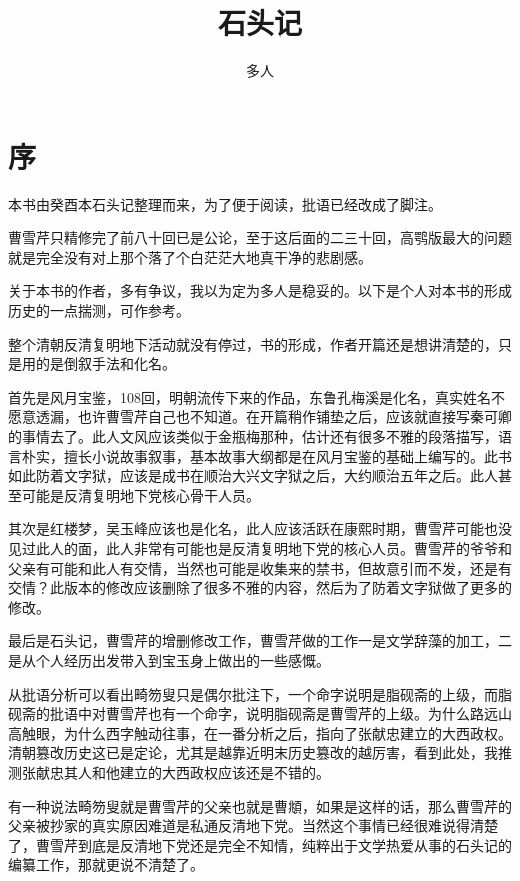 \documentclass[12pt,oneside]{book}
\title{石头记}
\author{多人}
\begin{document}



\frontmatter 
{}
\chapter*{序}
本书由癸酉本石头记整理而来，为了便于阅读，批语已经改成了脚注。

曹雪芹只精修完了前八十回已是公论，至于这后面的二三十回，高鹗版最大的问题就是完全没有对上那个落了个白茫茫大地真干净的悲剧感。

关于本书的作者，多有争议，我以为定为多人是稳妥的。以下是个人对本书的形成历史的一点揣测，可作参考。

整个清朝反清复明地下活动就没有停过，书的形成，作者开篇还是想讲清楚的，只是用的是倒叙手法和化名。

首先是风月宝鉴，108回，明朝流传下来的作品，东鲁孔梅溪是化名，真实姓名不愿意透漏，也许曹雪芹自己也不知道。在开篇稍作铺垫之后，应该就直接写秦可卿的事情去了。此人文风应该类似于金瓶梅那种，估计还有很多不雅的段落描写，语言朴实，擅长小说故事叙事，基本故事大纲都是在风月宝鉴的基础上编写的。此书如此防着文字狱，应该是成书在顺治大兴文字狱之后，大约顺治五年之后。此人甚至可能是反清复明地下党核心骨干人员。

其次是红楼梦，吴玉峰应该也是化名，此人应该活跃在康熙时期，曹雪芹可能也没见过此人的面，此人非常有可能也是反清复明地下党的核心人员。曹雪芹的爷爷和父亲有可能和此人有交情，当然也可能是收集来的禁书，但故意引而不发，还是有交情？此版本的修改应该删除了很多不雅的内容，然后为了防着文字狱做了更多的修改。

最后是石头记，曹雪芹的增删修改工作，曹雪芹做的工作一是文学辞藻的加工，二是从个人经历出发带入到宝玉身上做出的一些感慨。

从批语分析可以看出畸笏叟只是偶尔批注下，一个命字说明是脂砚斋的上级，而脂砚斋的批语中对曹雪芹也有一个命字，说明脂砚斋是曹雪芹的上级。为什么路远山高触眼，为什么西字触动往事，在一番分析之后，指向了张献忠建立的大西政权。清朝篡改历史这已是定论，尤其是越靠近明末历史篡改的越厉害，看到此处，我推测张献忠其人和他建立的大西政权应该还是不错的。

有一种说法畸笏叟就是曹雪芹的父亲也就是曹頫，如果是这样的话，那么曹雪芹的父亲被抄家的真实原因难道是私通反清地下党。当然这个事情已经很难说得清楚了，曹雪芹到底是反清地下党还是完全不知情，纯粹出于文学热爱从事的石头记的编纂工作，那就更说不清楚了。
\end{document}
